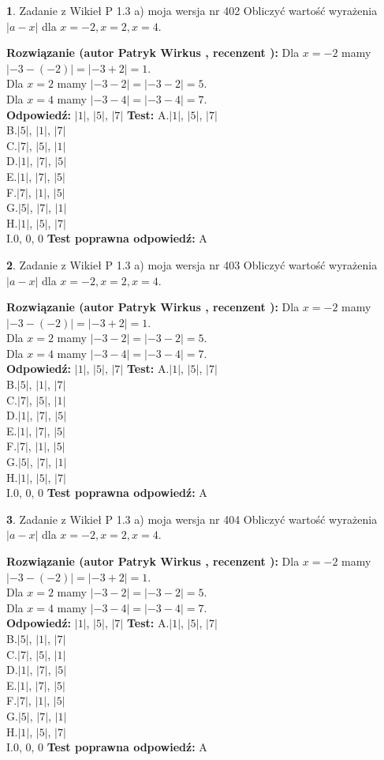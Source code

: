 \documentclass[12pt, a4paper]{article}
\theoremstyle{definition} %
\newtheorem{zad}{}
\newcommand{\zadStart}[1]{\begin{zad}#1\newline}
\newcommand{\zadStop}{\end{zad}}
\newcommand{\rozwStart}[2]{\noindent \textbf{Rozwiązanie (autor #1 , recenzent #2): }\newline}
\newcommand{\rozwStop}{\newline}
\newcommand{\odpStart}{\noindent \textbf{Odpowiedź:}\newline}
\newcommand{\odpStop}{\newline}
\newcommand{\testStart}{\noindent \textbf{Test:}\newline}
\newcommand{\testStop}{\newline}
\newcommand{\kluczStart}{\noindent \textbf{Test poprawna odpowiedź:}\newline}
\newcommand{\kluczStop}{\newline}
\begin{document}
\zadStart{Zadanie z Wikieł P 1.3 a) moja wersja nr 402}
Obliczyć wartość wyrażenia $|a - x|$ dla $x=-2,x=2,x=4$.
\zadStop
\rozwStart{Patryk Wirkus}{}
Dla $x = -2$ mamy $|-3 - (-2)| = |-3 + 2| = 1$.\\
Dla $x = 2$ mamy $|-3 - 2| = |-3 - 2| = 5$.\\
Dla $x = 4$ mamy $|-3 - 4| = |-3 - 4| = 7$.\\
\rozwStop
\odpStart
$|1|$, $|5|$, $|7|$
\odpStop
\testStart
A.$|1|$, $|5|$, $|7|$\\
B.$|5|$, $|1|$, $|7|$\\
C.$|7|$, $|5|$, $|1|$\\
D.$|1|$, $|7|$, $|5|$\\
E.$|1|$, $|7|$, $|5|$\\
F.$|7|$, $|1|$, $|5|$\\
G.$|5|$, $|7|$, $|1|$\\
H.$|1|$, $|5|$, $|7|$\\
I.$0$, $0$, $0$
\testStop
\kluczStart
A
\kluczStop



\zadStart{Zadanie z Wikieł P 1.3 a) moja wersja nr 403}
Obliczyć wartość wyrażenia $|a - x|$ dla $x=-2,x=2,x=4$.
\zadStop
\rozwStart{Patryk Wirkus}{}
Dla $x = -2$ mamy $|-3 - (-2)| = |-3 + 2| = 1$.\\
Dla $x = 2$ mamy $|-3 - 2| = |-3 - 2| = 5$.\\
Dla $x = 4$ mamy $|-3 - 4| = |-3 - 4| = 7$.\\
\rozwStop
\odpStart
$|1|$, $|5|$, $|7|$
\odpStop
\testStart
A.$|1|$, $|5|$, $|7|$\\
B.$|5|$, $|1|$, $|7|$\\
C.$|7|$, $|5|$, $|1|$\\
D.$|1|$, $|7|$, $|5|$\\
E.$|1|$, $|7|$, $|5|$\\
F.$|7|$, $|1|$, $|5|$\\
G.$|5|$, $|7|$, $|1|$\\
H.$|1|$, $|5|$, $|7|$\\
I.$0$, $0$, $0$
\testStop
\kluczStart
A
\kluczStop



\zadStart{Zadanie z Wikieł P 1.3 a) moja wersja nr 404}
Obliczyć wartość wyrażenia $|a - x|$ dla $x=-2,x=2,x=4$.
\zadStop
\rozwStart{Patryk Wirkus}{}
Dla $x = -2$ mamy $|-3 - (-2)| = |-3 + 2| = 1$.\\
Dla $x = 2$ mamy $|-3 - 2| = |-3 - 2| = 5$.\\
Dla $x = 4$ mamy $|-3 - 4| = |-3 - 4| = 7$.\\
\rozwStop
\odpStart
$|1|$, $|5|$, $|7|$
\odpStop
\testStart
A.$|1|$, $|5|$, $|7|$\\
B.$|5|$, $|1|$, $|7|$\\
C.$|7|$, $|5|$, $|1|$\\
D.$|1|$, $|7|$, $|5|$\\
E.$|1|$, $|7|$, $|5|$\\
F.$|7|$, $|1|$, $|5|$\\
G.$|5|$, $|7|$, $|1|$\\
H.$|1|$, $|5|$, $|7|$\\
I.$0$, $0$, $0$
\testStop
\kluczStart
A
\kluczStop
\end{document}

